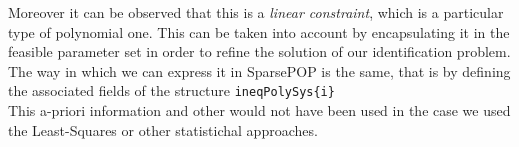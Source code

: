Moreover it can be observed that this is a \textit{linear constraint}, which is a particular type of polynomial one. This can be taken into account by encapsulating it in the feasible parameter set in order to refine the solution of our identification problem. The way in which we can express it in SparsePOP is the same, that is by defining the associated fields of the structure \texttt{ineqPolySys\{i\}}\\
This a-priori information and other would not have been used in the case we used the Least-Squares or other statistichal approaches.






